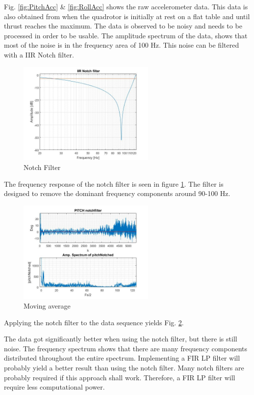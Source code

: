 Fig. \ref{fig:PitchAcc} \& \ref{fig:RollAcc} shows the raw accelerometer data. This data is also obtained from when the quadrotor is initially at rest on a flat table and until thrust reaches the maximum. The data is observed to be noisy and needs to be processed in order to be usable. The amplitude spectrum of the data, shows that most of the noise is in the frequency area of 100 Hz. This noise can be filtered with a IIR Notch filter.
\begin{figure}[H]
    \centering
         \includegraphics[width = 0.6\textwidth]{VAPIQ-PICTURES/NotchResp.jpg}
      \caption{Notch Filter}
    \label{fig:notchResp}
\end{figure} 
The frequency response of the notch filter is seen in figure \ref{fig:notchResp}. The filter is designed to remove the dominant frequency components around 90-100 Hz.
\begin{figure}[H]
    \centering
         \includegraphics[width = 0.6\textwidth]{VAPIQ-PICTURES/PitchNotchFilt.jpg}
      \caption{Moving average}
    \label{fig:pitchNotchedFig}
\end{figure}
Applying the notch filter to the data sequence yields Fig. \ref{fig:pitchNotchedFig}. \bigskip

The data got significantly better when using the notch filter, but there is still noise. The frequency spectrum shows that there are many frequency components distributed throughout the entire spectrum. Implementing a FIR LP filter will probably yield a better result than using the notch filter. Many notch filters are probably required if this approach shall work. Therefore, a FIR LP filter will require less computational power. \bigskip

